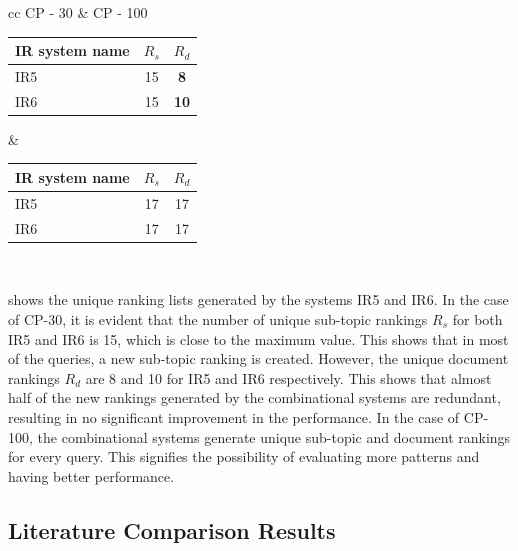 \begin{center}
	\label{tab:unique_ranking_counts}
	\begin{tabular}{ cc }   %
		CP - 30 & CP - 100 \\  
		\begin{tabularx}{.35\textwidth}{|Y|c|c|}
			\hline
			IR system name & $R_s$ & $R_d$ \\
			\hline
			IR5 & 15 & \textbf{8} \\
			\hline
			IR6 & 15 & \textbf{10} \\
			\hline
			
		\end{tabularx} &  %
		\begin{tabularx}{.35\textwidth}{|Y|c|c|}
	\hline
	IR system name & $R_s$ & $R_d$ \\
	\hline
	IR5 & 17 & 17 \\
	\hline
	IR6 & 17 & 17 \\
	\hline
			
		\end{tabularx} \\
	\end{tabular}
\end{center}

 shows the unique ranking lists generated by the systems IR5 and IR6. In the case of CP-30, it is evident that the number of unique sub-topic rankings $R_s$ for both IR5 and IR6 is 15, which is close to the maximum value. This shows that in most of the queries, a new sub-topic ranking is created. However, the unique document rankings $R_d$ are 8 and 10 for IR5 and IR6 respectively. This shows that almost half of the new rankings generated by the combinational systems are redundant, resulting in no significant improvement in the performance. In the case of CP-100, the combinational systems generate unique sub-topic and document rankings for every query. This signifies the possibility of evaluating more patterns and having better performance.

\subsection{Literature Comparison Results}



